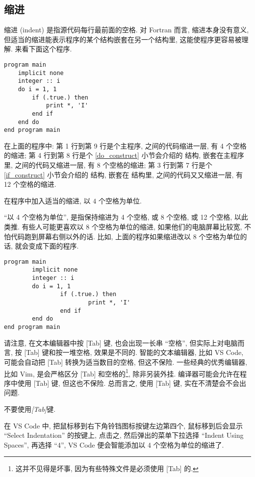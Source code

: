 \subsection{缩进}\label{indent}

缩进 (indent) 是指源代码每行最前面的空格. 对 Fortran 而言, 缩进本身没有意义, 但适当的缩进能表示程序的某个结构嵌套在另一个结构里, 这能使程序更容易被理解. 来看下面这个程序.
\begin{lstlisting}
program main
    implicit none
    integer :: i
    do i = 1, 1
        if (.true.) then
            print *, 'I'
        end if
    end do
end program main
\end{lstlisting}
在上面的程序中: 第 1 行到第 9 行是个主程序, 之间的代码缩进一层, 有 4 个空格的缩进; 第 4 行到第 8 行是个 \ref{do_construct} 小节会介绍的  结构, 嵌套在主程序里, 之间的代码又缩进一层, 有 8 个空格的缩进; 第 3 行到第 7 行是个 \ref{if_construct} 小节会介绍的  结构, 嵌套在  结构里, 之间的代码又又缩进一层, 有 12 个空格的缩进.
\begin{convention}
    在程序中加入适当的缩进, 以 $4$ 个空格为单位.\label{fortran_indent}
\end{convention}
``以 4 个空格为单位'', 是指保持缩进为 4 个空格, 或 8 个空格, 或 12 个空格, 以此类推. 有些人可能更喜欢以 8 个空格为单位的缩进, 如果他们的电脑屏幕比较宽, 不怕代码跑到屏幕右侧以外的话. 比如, 上面的程序如果缩进改以 8 个空格为单位的话, 就会变成下面的程序.
\begin{lstlisting}
program main
        implicit none
        integer :: i
        do i = 1, 1
                if (.true.) then
                        print *, 'I'
                end if
        end do
end program main
\end{lstlisting}

请注意, 在文本编辑器中按 [Tab] 键, 也会出现一长串 ``空格'', 但实际上对电脑而言, 按 [Tab] 键和按一堆空格, 效果是不同的. 智能的文本编辑器, 比如 VS Code, 可能会自动把 [Tab] 转换为适当数目的空格, 但这不保险. 一些经典的优秀编辑器, 比如 Vim, 是会严格区分 [Tab] 和空格的\footnote{
    这并不见得是坏事, 因为有些特殊文件是必须使用 [Tab] 的.
}, 除非另装外挂. 编译器可能会允许在程序中使用 [Tab] 键, 但这也不保险. 总而言之, 使用 [Tab] 键, 实在不清楚会不会出问题.
\begin{convention}
    不要使用\emph{[Tab]}键.
\end{convention}

在 VS Code 中, 把鼠标移到右下角铃铛图标按键左边第四个, 鼠标移到后会显示 ``Select Indentation'' 的按键上, 点击之, 然后弹出的菜单下拉选择 ``Indent Using Spaces'', 再选择 ``4'', VS Code 便会智能添加以 4 个空格为单位的缩进了.

